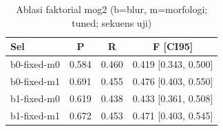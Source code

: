 \begin{table}[t]
\centering
\caption{Ablasi faktorial mog2 (b=blur, m=morfologi; tuned; sekuens uji)}
\label{tab:table_ablation_cells_mog2}
\begin{tabular}{lccc}
\toprule
Sel & P & R & F [CI95] \\
\midrule
b0-fixed-m0 & 0.584 & 0.460 & 0.419 [0.343, 0.500] \\
b0-fixed-m1 & 0.691 & 0.455 & 0.476 [0.403, 0.550] \\
b1-fixed-m0 & 0.619 & 0.438 & 0.433 [0.361, 0.508] \\
b1-fixed-m1 & 0.672 & 0.453 & 0.471 [0.403, 0.545] \\
\bottomrule
\end{tabular}
\end{table}
